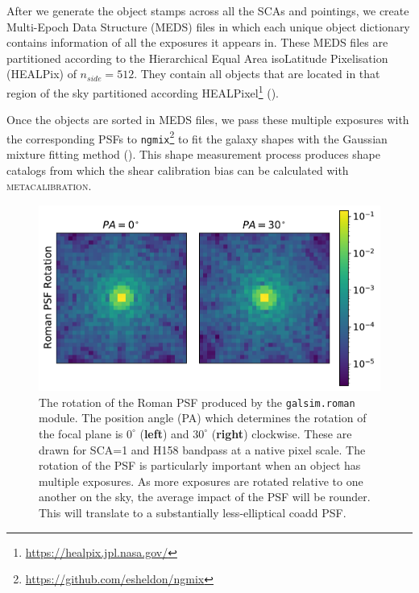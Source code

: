 \documentclass[fleqn,usenatbib]{mnras}
\begin{document}
After we generate the object stamps across all the SCAs and pointings, we create Multi-Epoch Data Structure (MEDS) files in which each unique object dictionary contains information of all the exposures it appears in. These MEDS files are partitioned according to the Hierarchical Equal Area isoLatitude Pixelisation (HEALPix) of $n_{side}=512$. They contain all objects that are located in that region of the sky partitioned according HEALPixel\footnote{\url{https://healpix.jpl.nasa.gov/}} (\citealt{2005ApJ...622..759G, Zonca2019}). 


Once the objects are sorted in MEDS files, we pass these multiple exposures with the corresponding PSFs to \texttt{ngmix}\footnote{\url{ https://github.com/esheldon/ngmix}} to fit the galaxy shapes with the Gaussian mixture fitting method (\citealt{2014MNRAS.444L..25S}). This shape measurement process produces shape catalogs from which the shear calibration bias can be calculated with \textsc{metacalibration}.

\begin{figure}
	\includegraphics[width=\columnwidth]{psf_rotation.pdf}
    \caption{The rotation of the Roman PSF produced by the \texttt{galsim.roman} module. The position angle (PA) which determines the rotation of the focal plane is $0^{\circ}$ (\textbf{left}) and $30^{\circ}$ (\textbf{right}) clockwise. These are drawn for SCA=1 and H158 bandpass at a native pixel scale. The rotation of the PSF is particularly important when an object has multiple exposures. As more exposures are rotated relative to one another on the sky, the average impact of the PSF will be rounder. This will translate to a substantially less-elliptical coadd PSF.}
    \label{fig:psfrot}
\end{figure}
\end{document}
